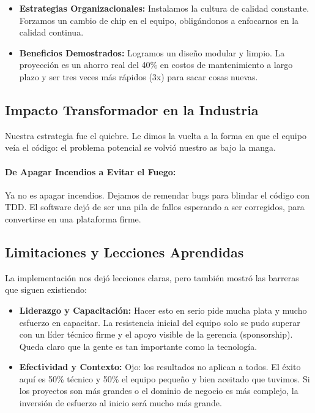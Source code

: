 \begin{itemize}
\item \textbf{Estrategias Organizacionales:} Instalamos la cultura de calidad constante. Forzamos un cambio de chip en el equipo, obligándonos a enfocarnos en la calidad continua.

\item \textbf{Beneficios Demostrados:} Logramos un diseño modular y limpio. La proyección es un ahorro real del 40\% en costos de mantenimiento a largo plazo y ser tres veces más rápidos (3x) para sacar cosas nuevas.
\end{itemize}

\subsection{Impacto Transformador en la Industria}

Nuestra estrategia fue el quiebre. Le dimos la vuelta a la forma en que el equipo veía el código: el problema potencial se volvió nuestro as bajo la manga.

\paragraph{De Apagar Incendios a Evitar el Fuego:}

Ya no es apagar incendios. Dejamos de remendar bugs para blindar el código con TDD. El software dejó de ser una pila de fallos esperando a ser corregidos, para convertirse en una plataforma firme.

\subsection{Limitaciones y Lecciones Aprendidas}

La implementación nos dejó lecciones claras, pero también mostró las barreras que siguen existiendo:

\begin{itemize}
\item \textbf{Liderazgo y Capacitación:} Hacer esto en serio pide mucha plata y mucho esfuerzo en capacitar. La resistencia inicial del equipo solo se pudo superar con un líder técnico firme y el apoyo visible de la gerencia (sponsorship). Queda claro que la gente es tan importante como la tecnología.

\item \textbf{Efectividad y Contexto:} Ojo: los resultados no aplican a todos. El éxito aquí es 50\% técnico y 50\% el equipo pequeño y bien aceitado que tuvimos. Si los proyectos son más grandes o el dominio de negocio es más complejo, la inversión de esfuerzo al inicio será mucho más grande.
\end{itemize}

